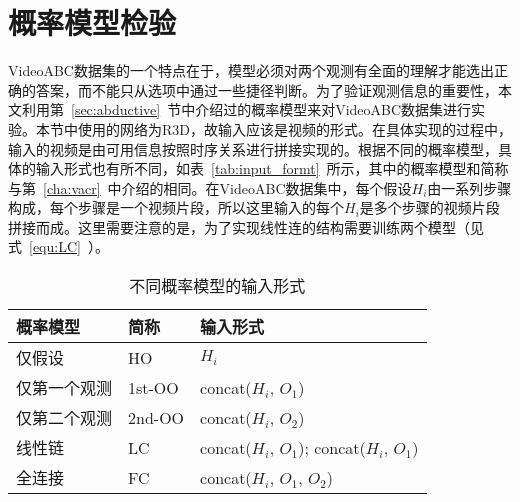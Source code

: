 \section{概率模型检验}\label{sec:exp:prob}
VideoABC数据集的一个特点在于，模型必须对两个观测有全面的理解才能选出正确的答案，而不能只从选项中通过一些捷径判断。为了验证观测信息的重要性，本文利用第~\ref{sec:abductive}~节中介绍过的概率模型来对VideoABC数据集进行实验。本节中使用的网络为R3D\cite{tran2018closer}，故输入应该是视频的形式。在具体实现的过程中，输入的视频是由可用信息按照时序关系进行拼接实现的。根据不同的概率模型，具体的输入形式也有所不同，如表~\ref{tab:input_formt}~所示，其中的概率模型和简称与第~\ref{cha:vacr}~中介绍的相同。在VideoABC数据集中，每个假设$H_i$由一系列步骤构成，每个步骤是一个视频片段，所以这里输入的每个$H_i$是多个步骤的视频片段拼接而成。这里需要注意的是，为了实现线性连的结构需要训练两个模型（见式~\eqref{equ:LC}~）。

\begin{table}
\caption{不同概率模型的输入形式}
\label{tab:input_format}
\begin{tabu}to \textwidth {XXX[2]}\\\toprule
    概率模型 & 简称 & 输入形式\\
    \midrule
    仅假设 & HO & $H_i$\\
    仅第一个观测 & 1st-OO & concat($H_i$, $O_1$)\\
    仅第二个观测 & 2nd-OO  & concat($H_i$, $O_2$)\\
    线性链 & LC & concat($H_i$, $O_1$); concat($H_i$, $O_1$)\\
    全连接 & FC & concat($H_i$, $O_1$, $O_2$)\\     \bottomrule
\end{tabu}
\end{table}

